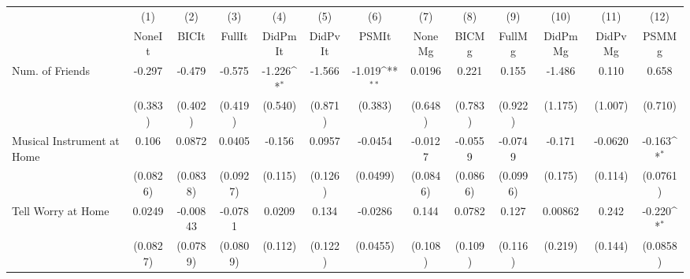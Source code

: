 {
\def\sym#1{\ifmmode^{#1}\else\(^{#1}\)\fi}
\begin{tabular}{l*{12}{c}}
\toprule
            &\multicolumn{1}{c}{(1)}&\multicolumn{1}{c}{(2)}&\multicolumn{1}{c}{(3)}&\multicolumn{1}{c}{(4)}&\multicolumn{1}{c}{(5)}&\multicolumn{1}{c}{(6)}&\multicolumn{1}{c}{(7)}&\multicolumn{1}{c}{(8)}&\multicolumn{1}{c}{(9)}&\multicolumn{1}{c}{(10)}&\multicolumn{1}{c}{(11)}&\multicolumn{1}{c}{(12)}\\
            &\multicolumn{1}{c}{NoneIt}&\multicolumn{1}{c}{BICIt}&\multicolumn{1}{c}{FullIt}&\multicolumn{1}{c}{DidPmIt}&\multicolumn{1}{c}{DidPvIt}&\multicolumn{1}{c}{PSMIt}&\multicolumn{1}{c}{NoneMg}&\multicolumn{1}{c}{BICMg}&\multicolumn{1}{c}{FullMg}&\multicolumn{1}{c}{DidPmMg}&\multicolumn{1}{c}{DidPvMg}&\multicolumn{1}{c}{PSMMg}\\
\midrule
Num. of Friends&      -0.297         &      -0.479         &      -0.575         &      -1.226\sym{*}  &      -1.566         &      -1.019\sym{**} &      0.0196         &       0.221         &       0.155         &      -1.486         &       0.110         &       0.658         \\
            &     (0.383)         &     (0.402)         &     (0.419)         &     (0.540)         &     (0.871)         &     (0.383)         &     (0.648)         &     (0.783)         &     (0.922)         &     (1.175)         &     (1.007)         &     (0.710)         \\
\addlinespace
Musical Instrument at Home&       0.106         &      0.0872         &      0.0405         &      -0.156         &      0.0957         &     -0.0454         &     -0.0127         &     -0.0559         &     -0.0749         &      -0.171         &     -0.0620         &      -0.163\sym{*}  \\
            &    (0.0826)         &    (0.0838)         &    (0.0927)         &     (0.115)         &     (0.126)         &    (0.0499)         &    (0.0846)         &    (0.0866)         &    (0.0996)         &     (0.175)         &     (0.114)         &    (0.0761)         \\
\addlinespace
Tell Worry at Home&      0.0249         &    -0.00843         &     -0.0781         &      0.0209         &       0.134         &     -0.0286         &       0.144         &      0.0782         &       0.127         &     0.00862         &       0.242         &      -0.220\sym{*}  \\
            &    (0.0827)         &    (0.0789)         &    (0.0809)         &     (0.112)         &     (0.122)         &    (0.0455)         &     (0.108)         &     (0.109)         &     (0.116)         &     (0.219)         &     (0.144)         &    (0.0858)         \\

\end{tabular}}
